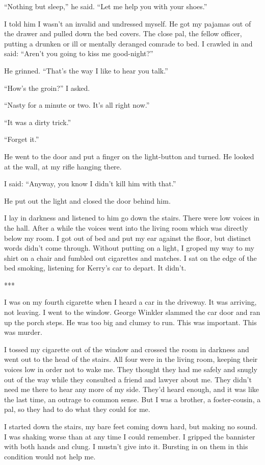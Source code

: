 {“Nothing but sleep,” he said. “Let me help you with your shoes.”

I told him I wasn’t an invalid and undressed myself. He got my pajamas out of the drawer and pulled down the bed covers. The close pal, the fellow officer, putting a drunken or ill or mentally deranged comrade to bed. I crawled in and said: “Aren’t you going to kiss me good-night?”

He grinned. “That’s the way I like to hear you talk.”

“How’s the groin?” I asked.

“Nasty for a minute or two. It’s all right now.”

“It was a dirty trick.”

“Forget it.”

He went to the door and put a finger on the light-button and turned. He looked at the wall, at my rifle hanging there.

I said: “Anyway, you know I didn’t kill him with that.”

He put out the light and closed the door behind him.

I lay in darkness and listened to him go down the stairs. There were low voices in the hall. After a while the voices went into the living room which was directly below my room. I got out of bed and put my ear against the floor, but distinct words didn’t come through. Without putting on a light, I groped my way to my shirt on a chair and fumbled out cigarettes and matches. I sat on the edge of the bed smoking, listening for Kerry’s car to depart. It didn’t.

***

I was on my fourth cigarette when I heard a car in the driveway. It was arriving, not leaving. I went to the window. George Winkler slammed the car door and ran up the porch steps. He was too big and clumsy to run. This was important. This was murder.

I tossed my cigarette out of the window and crossed the room in darkness and went out to the head of the stairs. All four were in the living room, keeping their voices low in order not to wake me. They thought they had me safely and snugly out of the way while they consulted a friend and lawyer about me. They didn’t need me there to hear any more of my side. They’d heard enough, and it was like the last time, an outrage to common sense. But I was a brother, a foster-cousin, a pal, so they had to do what they could for me.

I started down the stairs, my bare feet coming down hard, but making no sound. I was shaking worse than at any time I could remember. I gripped the bannister with both hands and clung. I mustn’t give into it. Bursting in on them in this condition would not help me.

}
